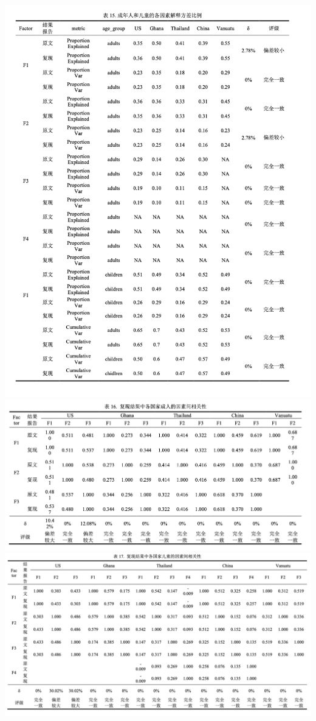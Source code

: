 \documentclass[
  man]{apa6}
\begin{document}
\includegraphics{./Script_Re_Weisman_2021_Group1_2024_files/Repeatability_figures/table15.png}
\includegraphics{./Script_Re_Weisman_2021_Group1_2024_files/Repeatability_figures/table16.png}
\includegraphics{./Script_Re_Weisman_2021_Group1_2024_files/Repeatability_figures/table17.png}
\end{document}
